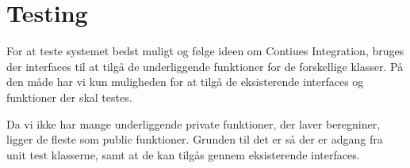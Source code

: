 
\section{Testing}
For at teste systemet bedst muligt og følge ideen om Contiues Integration,
 bruges der interfaces til at tilgå de underliggende funktioner for de forskellige klasser.
 På den måde har vi kun muligheden for at tilgå de eksisterende interfaces og funktioner der skal testes. 
 
 Da vi ikke har mange underliggende private funktioner, der laver beregniner, ligger de fleste som public funktioner.
 Grunden til det er så der er adgang fra unit test klasserne, samt at de kan tilgås gennem eksisterende interfaces.
